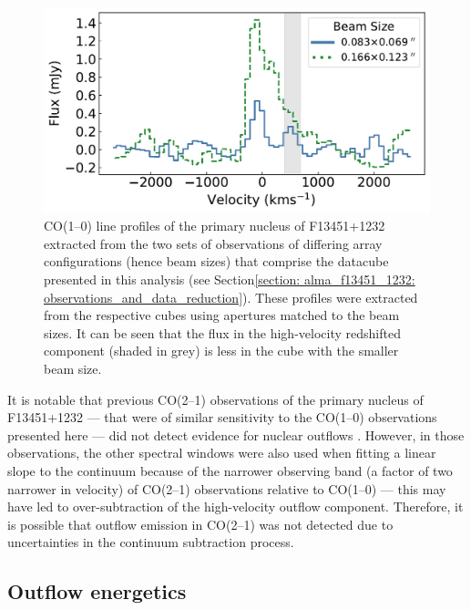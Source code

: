 \begin{figure}[!b]
    \centering
    \includegraphics[width=0.75\linewidth]{figures/alma_f13451_1232/beam_comparison.pdf}
    \caption[CO(1--0) velocity profiles of the nuclear outflow in the primary nucleus of F13451+1232 extracted from observations of differing array configurations (hence beam sizes).]{CO(1--0) line profiles of the primary nucleus of F13451+1232 extracted from the two sets of observations of differing array configurations (hence beam sizes) that comprise the datacube presented in this analysis (see Section\;\ref{section: alma_f13451_1232: observations_and_data_reduction}). These profiles were extracted from the respective cubes using apertures matched to the beam sizes. It can be seen that the flux in the high-velocity redshifted component (shaded in grey) is less in the cube with the smaller beam size.}
    \label{fig: alma_f13451_1232: beam_comparison}
\end{figure}

It is notable that previous CO(2--1) observations of the primary nucleus of F13451+1232 --- that were of similar sensitivity to the CO(1--0) observations presented here --- did not detect evidence for nuclear outflows \citep{Lamperti2022}. However, in those observations, the other spectral windows were also used when fitting a linear slope to the continuum because of the narrower observing band (a factor of two narrower in velocity) of CO(2--1) observations relative to CO(1--0) --- this may have led to over-subtraction of the high-velocity outflow component. Therefore, it is possible that outflow emission in CO(2--1) was not detected due to uncertainties in the continuum subtraction process.

\subsection{Outflow energetics}
\label{section: alma_f13451_1232: analysis_and_results: outflow_energetics}

